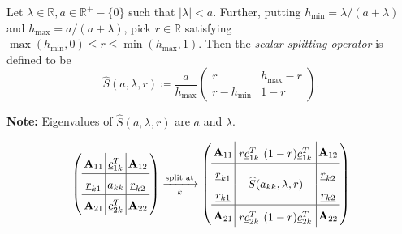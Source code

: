 \documentclass{beamer}
\begin{document}
\begin{frame}

  \begin{definition}
    Let $\lambda \in \mathbb{R}, a \in \mathbb{R}^+ - \{0\}$ such that $\vert \lambda \vert < a$.
    Further, putting $h_{\text{min}} = \lambda / (a + \lambda)$ and $h_{\text{max}} = a / (a + \lambda)$, pick $r \in \mathbb{R}$ satisfying $\max{(h_{\text{min}},0)} \leq r \leq \min{(h_{\text{max}},1)}$.
    Then the \emph{scalar splitting operator} is defined to be $$\widehat{S}(a,\lambda,r) \coloneqq \frac{a}{h_{\text{max}}} \begin{pmatrix} r & h_{\text{max}} - r\\r - h_{\text{min}} & 1 - r \end{pmatrix}.$$
  \end{definition}

  \textbf{Note:} Eigenvalues of $\widehat{S}(a,\lambda,r)$ are $a$ and $\lambda$.

  \begin{align*}
    \arraycolsep=1.8pt\def\arraystretch{1.5}
    \left( \begin{array}{c|c|c} \mathbf{A}_{11} & \underline{c}_{1k}^T & \mathbf{A}_{12}\\\hline \underline{r}_{k1} & a_{kk} & \underline{r}_{k2}\\\hline \mathbf{A}_{21} & \underline{c}_{2k}^T & \mathbf{A}_{22} \end{array} \right) \xrightarrow[k]{\text{split at}} \left( \begin{array}{c|c|c} \mathbf{A}_{11} & \begin{array}{cc} r\underline{c}_{1k}^T & (1-r) \underline{c}_{1k}^T \end{array} & \mathbf{A}_{12}\\\hline \underline{r}_{k1} & \multirow{2}{*}{$\widehat{S}(a_{kk},\lambda,r)$} & \underline{r}_{k2}\\\underline{r_{k1}} && \underline{r_{k2}}\\\hline \mathbf{A}_{21} & \begin{array}{cc} r \underline{c}_{2k}^T & (1-r) \underline{c}_{2k}^T \end{array} & \mathbf{A}_{22} \end{array} \right)
  \end{align*}
\end{frame}
\end{document}
